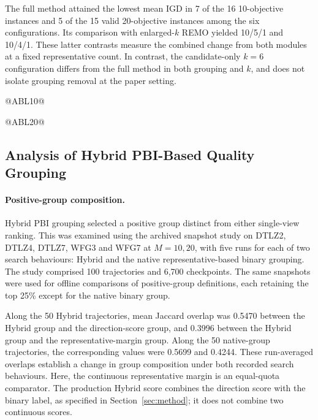 The full method attained the lowest mean IGD in 7 of the 16
10-objective instances and 5 of the 15 valid 20-objective instances among
the six configurations. Its comparison with enlarged-$k$ REMO yielded
10/5/1 and 10/4/1. These latter contrasts measure the combined change
from both modules at a fixed representative count. In contrast, the
candidate-only $k=6$ configuration differs from the full method in both
grouping and $k$, and does not isolate grouping removal at the paper
setting.

@ABL10@

@ABL20@


\subsection{Analysis of Hybrid PBI-Based Quality Grouping}
\label{sec:exp:hpc}

\paragraph{Positive-group composition.}
Hybrid PBI grouping selected a positive group distinct from either
single-view ranking. This was examined using the archived snapshot study
on DTLZ2, DTLZ4, DTLZ7, WFG3 and WFG7 at $M=10,20$, with five runs for
each of two search behaviours: Hybrid and the native representative-based
binary grouping. The study comprised 100 trajectories and 6,700
checkpoints. The same snapshots were used for offline comparisons of
positive-group definitions, each retaining the top 25\% except for the
native binary group.

Along the 50 Hybrid trajectories, mean Jaccard overlap was 0.5470 between
the Hybrid group and the direction-score group, and 0.3996 between the
Hybrid group and the representative-margin group. Along the 50
native-group trajectories, the corresponding values were 0.5699 and
0.4244. These run-averaged overlaps establish a change in group
composition under both recorded search behaviours. Here, the continuous
representative margin is an equal-quota comparator. The production
Hybrid score combines the direction score with the binary label, as
specified in Section~\ref{sec:method}; it does not combine two continuous
scores.

